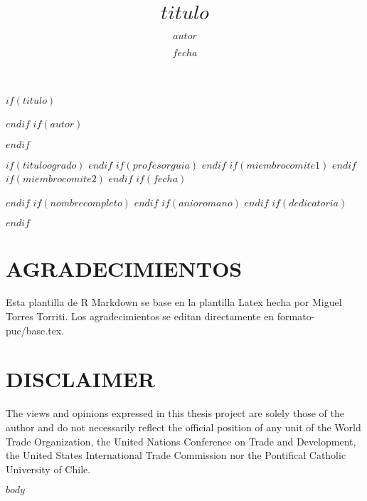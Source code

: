 \documentclass[12pt,reqno,oneside,pdftex]{formato-puc/puctesis} %
\begin{document}
$if(titulo)$
\title{$titulo$}
$endif$
$if(autor)$
\author{$autor$}
$endif$

$if(tituloogrado)$
$endif$
$if(profesorguia)$
$endif$
$if(miembrocomite1)$
$endif$
$if(miembrocomite2)$
$endif$
$if(fecha)$
\date         {$fecha$}
$endif$
$if(nombrecompleto)$
$endif$
$if(anioromano)$
$endif$
$if(dedicatoria)$
\dedication   {$dedicatoria$}
$endif$

\PageNumbersFootCentered
{}
\maketitle

\chapter*{AGRADECIMIENTOS}
Esta plantilla de R Markdown se base en la plantilla Latex hecha por
Miguel Torres Torriti. Los agradecimientos se editan directamente en formato-puc/base.tex.
\par

\cleardoublepage
\tableofcontents
\listoffigures          
\listoftables           
\cleardoublepage

\chapter*{DISCLAIMER}

The views and opinions expressed in this thesis project are solely those of the author and do not necessarily reflect the official position of any unit of the World Trade Organization, the United Nations Conference on Trade and Development, the United States International Trade Commission nor the Pontifical Catholic University of Chile.

\cleardoublepage %

\NoChapterPageNumber           %

$body$
\end{document}
